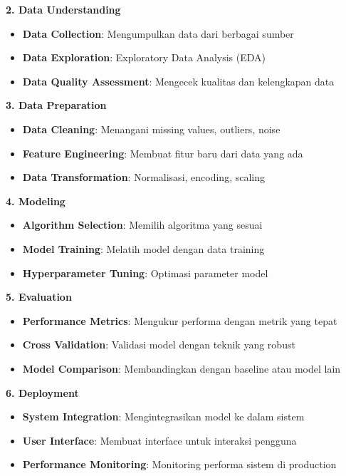 \textbf{2. Data Understanding}
\begin{itemize}
    \item \textbf{Data Collection}: Mengumpulkan data dari berbagai sumber
    \item \textbf{Data Exploration}: Exploratory Data Analysis (EDA)
    \item \textbf{Data Quality Assessment}: Mengecek kualitas dan kelengkapan data
\end{itemize}

\textbf{3. Data Preparation}
\begin{itemize}
    \item \textbf{Data Cleaning}: Menangani missing values, outliers, noise
    \item \textbf{Feature Engineering}: Membuat fitur baru dari data yang ada
    \item \textbf{Data Transformation}: Normalisasi, encoding, scaling
\end{itemize}

\textbf{4. Modeling}
\begin{itemize}
    \item \textbf{Algorithm Selection}: Memilih algoritma yang sesuai
    \item \textbf{Model Training}: Melatih model dengan data training
    \item \textbf{Hyperparameter Tuning}: Optimasi parameter model
\end{itemize}

\textbf{5. Evaluation}
\begin{itemize}
    \item \textbf{Performance Metrics}: Mengukur performa dengan metrik yang tepat
    \item \textbf{Cross Validation}: Validasi model dengan teknik yang robust
    \item \textbf{Model Comparison}: Membandingkan dengan baseline atau model lain
\end{itemize}

\textbf{6. Deployment}
\begin{itemize}
    \item \textbf{System Integration}: Mengintegrasikan model ke dalam sistem
    \item \textbf{User Interface}: Membuat interface untuk interaksi pengguna
    \item \textbf{Performance Monitoring}: Monitoring performa sistem di production
\end{itemize}

